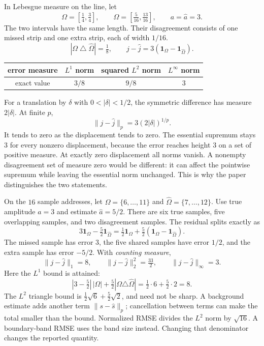 In Lebesgue measure on the line, let
\[
\Omega=[\tfrac14,\tfrac34],\qquad
\widehat\Omega=[\tfrac5{16},\tfrac{13}{16}],\qquad a=\widehat a=3.
\]
The two intervals have the same length. Their disagreement consists of one missed strip and one extra strip, each of width $1/16$.
\[
|\Omega\mathbin\triangle\widehat\Omega|=\tfrac18,
\qquad j-\widehat j=3(\mathbf1_\Omega-\mathbf1_{\widehat\Omega}).
\]
\begin{center}
\begin{tabular}{c|ccc}
error measure & $L^1$ norm & squared $L^2$ norm & $L^\infty$ norm\\\hline
exact value & $3/8$ & $9/8$ & $3$
\end{tabular}
\end{center}
For a translation by $\delta$ with $0<|\delta|<1/2$, the symmetric difference has measure $2|\delta|$. At finite $p$,
\[
\|j-\widehat j\|_p=3(2|\delta|)^{1/p}.
\]
It tends to zero as the displacement tends to zero. The essential supremum stays $3$ for every nonzero displacement, because the error reaches height $3$ on a set of positive measure. At exactly zero displacement all norms vanish.
A nonempty disagreement set of measure zero would be different: it can affect the pointwise supremum while leaving the essential norm unchanged. This is why the paper distinguishes the two statements.

On the $16$ sample addresses, let $\Omega=\{6,\ldots,11\}$ and $\widehat\Omega=\{7,\ldots,12\}$. Use true amplitude $a=3$ and estimate $\widehat a=5/2$. There are six true samples, five overlapping samples, and two disagreement samples.
The residual splits exactly as
\[
3\mathbf1_\Omega-\tfrac52\mathbf1_{\widehat\Omega}
=\tfrac12\mathbf1_\Omega+\tfrac52(\mathbf1_\Omega-\mathbf1_{\widehat\Omega}).
\]
The missed sample has error $3$, the five shared samples have error $1/2$, and the extra sample has error $-5/2$. With \emph{counting measure},
\[
\|j-\widehat j\|_1=8,
\qquad \|j-\widehat j\|_2^2=\tfrac{33}{2},
\qquad \|j-\widehat j\|_\infty=3.
\]
Here the $L^1$ bound is attained:
\[
|3-\tfrac52|\,|\Omega|+\tfrac52|\Omega\triangle\widehat\Omega|
=\tfrac12\cdot6+\tfrac52\cdot2=8.
\]
The $L^2$ triangle bound is $\frac12\sqrt6+\frac52\sqrt2$, and need not be sharp. A background estimate adds another term $\|s-\widehat s\|_p$; cancellation between terms can make the total smaller than the bound.
Normalized RMSE divides the $L^2$ norm by $\sqrt{16}$. A boundary-band RMSE uses the band size instead. Changing that denominator changes the reported quantity.

